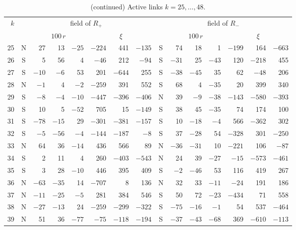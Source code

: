 \documentclass[11pt,a4paper]{amsart}
\theoremstyle{definition}
\theoremstyle{remark}
\numberwithin{equation}{section}
\begin{document}
\begin{table}[!htbp]
\centering
\caption{(continued) Active links $k=25,\dots,48$.}\label{tab:be-fields-2}
\scriptsize\setlength{\tabcolsep}{2.4pt}\renewcommand{\arraystretch}{1.0}
\begin{tabular}{@{}r@{\quad}c*{6}{r}@{\quad}c*{6}{r}@{}}
\toprule
$k$ & \multicolumn{7}{c}{field of $R_+$} & \multicolumn{7}{c}{field of $R_-$}\\
\cmidrule(lr){2-8}\cmidrule(l){9-15}
 & & \multicolumn{3}{c}{$100\,r$} & \multicolumn{3}{c}{$\xi$} & & \multicolumn{3}{c}{$100\,r$} & \multicolumn{3}{c}{$\xi$}\\
\midrule
25 & N & 27 & 13 & $-25$ & $-224$ & 441 & $-135$ & S & 74 & 18 & 1 & $-199$ & 164 & $-663$\\
26 & S & 5 & 56 & 4 & $-46$ & 212 & $-94$ & S & $-31$ & 25 & $-43$ & 120 & $-218$ & 455\\
27 & S & $-10$ & $-6$ & 53 & 201 & $-644$ & 255 & S & $-38$ & $-45$ & 35 & 62 & $-48$ & 206\\
28 & N & $-1$ & 4 & $-2$ & $-259$ & 391 & 552 & S & 68 & 4 & $-35$ & 20 & 399 & 340\\
29 & S & $-8$ & $-4$ & $-10$ & $-447$ & $-396$ & $-406$ & N & 39 & $-9$ & $-38$ & $-143$ & $-580$ & $-393$\\
30 & S & 10 & 5 & $-52$ & 705 & 15 & $-149$ & S & 38 & 45 & $-35$ & 74 & 174 & 100\\
31 & S & $-78$ & $-15$ & 29 & $-301$ & $-381$ & $-157$ & S & 10 & $-18$ & $-4$ & 566 & $-362$ & 302\\
32 & S & $-5$ & $-56$ & $-4$ & $-144$ & $-187$ & $-8$ & S & 37 & $-28$ & 54 & $-328$ & 301 & $-250$\\
33 & N & 64 & 36 & $-14$ & 436 & 566 & 89 & N & $-36$ & $-31$ & 10 & $-221$ & 106 & $-87$\\
34 & S & 2 & 11 & 4 & 260 & $-403$ & $-543$ & N & 24 & 39 & $-27$ & $-15$ & $-573$ & $-461$\\
35 & S & 3 & 28 & $-10$ & 446 & 395 & 409 & S & $-2$ & $-46$ & 53 & 116 & 419 & 267\\
36 & N & $-63$ & $-35$ & 14 & $-707$ & 8 & 136 & N & 32 & 33 & $-11$ & $-24$ & 191 & 186\\
37 & N & $-11$ & $-25$ & $-5$ & 281 & 384 & 546 & S & 50 & 72 & $-23$ & $-434$ & 71 & 558\\
38 & N & $-27$ & $-13$ & 24 & $-259$ & $-299$ & $-322$ & S & $-75$ & $-16$ & $-1$ & 54 & 537 & $-464$\\
39 & N & 51 & 36 & $-77$ & $-75$ & $-118$ & $-194$ & S & $-37$ & $-43$ & $-68$ & 369 & $-610$ & $-113$\\

\end{tabular}
\end{table}
\end{document}
